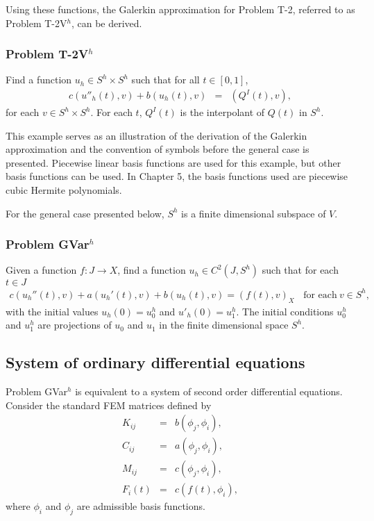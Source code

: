 \documentclass[../../main.tex]{subfiles}
\begin{document}
Using these functions, the Galerkin approximation for Problem T-2, referred to as Problem T-2V$^h$, can be derived.

\subsubsection{Problem T-2V$^h$}
Find a function $u_h \in S^h\times S^h$ such that for all $t \in [0,1]$,
\begin{eqnarray*}
	c(u''_h(t),v) + b(u_h(t),v) & = & (Q^I(t),v),
\end{eqnarray*} for each $v \in S^h\times S^h$. For each $t$, $Q^I(t)$ is the interpolant of $Q(t)$ in $S^h$.

This example serves as an illustration of the derivation of the Galerkin approximation and the convention of symbols before the general case is presented. Piecewise linear basis functions are used for this example, but other basis functions can be used. In Chapter 5, the basis functions used are piecewise cubic Hermite polynomials.

For the general case presented below, $S^h$ is a finite dimensional subspace of $V$.

\subsubsection*{Problem GVar$^h$}
Given a function $f: J \rightarrow X$, find a function $u_h \in C^2(J, S^h)$ such that for each $t\in J$
\begin{eqnarray}
	c(u_h''(t),v)+a(u_h'(t),v)+b(u_h(t),v)= (f(t),v)_{X} \ \ \ \ \textrm{for each} \ v \in S^h, \label{DC_E2}
\end{eqnarray}
with the initial values $u_h(0)=u^h_{0}$ and $u'_h(0)=u^h_{1}$. The initial conditions $u^h_{0}$ and $u^h_{1}$ are projections of $u_0$ and $u_1$ in the finite dimensional space $S^h$.

\subsection{System of ordinary differential equations}
Problem GVar$^h$ is equivalent to a system of second order differential equations. Consider the standard FEM matrices defined by
\begin{eqnarray*}
	K_{ij} & = & b(\phi_j, \phi_i),\\
	C_{ij} & = & a(\phi_j, \phi_i),\\
	M_{ij} & = & c(\phi_j, \phi_i),\\
	F_{i}(t) & = & c(f(t), \phi_i),
\end{eqnarray*} where $\phi_i$ and $\phi_j$ are admissible basis functions.
\end{document}
